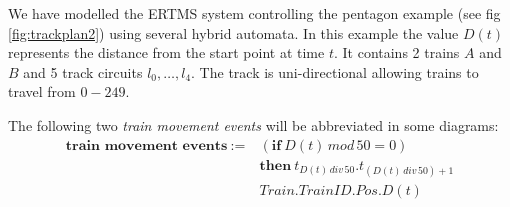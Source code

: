 We have modelled the ERTMS system controlling the pentagon example (see fig \ref{fig:trackplan2}) using several hybrid automata. In this example the value $D(t)$ represents the distance from the start point at time $t$. 
It contains 2 trains $A$ and $B$ and 5 track circuits $l_0, \ldots , l_4$. The track is uni-directional allowing trains to travel from $0 - 249$. 
\medskip
\begin{myremark}
The following two \emph{train movement events} will be abbreviated in some diagrams:
\begin{align*}
\textbf{train movement events}  \ :=  \ &( \textbf{if} \ D(t) \, mod \, 50 = 0)  \\
  &\textbf{then} \  t_{D(t) \, div \, 50}.t_{(D(t) \, div \, 50) +1} \\
&Train.TrainID.Pos.D(t)
\end{align*} 

\end{myremark}

